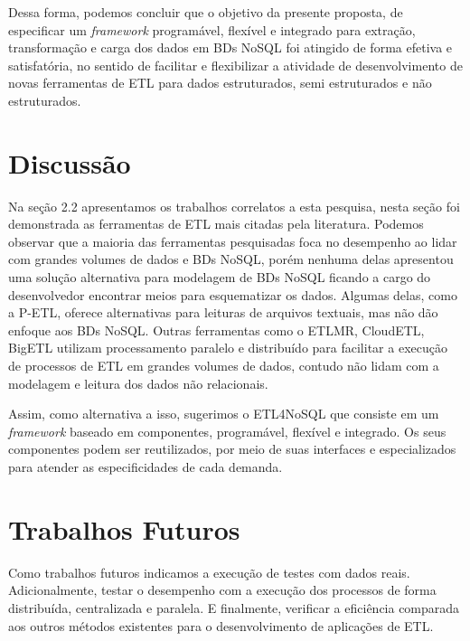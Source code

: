 Dessa forma, podemos concluir que o objetivo da presente proposta, de especificar um \textit{framework} programável, flexível e integrado para extração, transformação e carga dos dados em BDs NoSQL foi atingido de forma efetiva e satisfatória, no sentido de facilitar e flexibilizar a atividade de desenvolvimento de novas ferramentas de ETL para dados estruturados, semi estruturados e não estruturados.

\section{Discussão}

Na seção 2.2 apresentamos os trabalhos correlatos a esta pesquisa, nesta seção foi demonstrada as ferramentas de ETL mais citadas pela literatura. Podemos observar que a maioria das ferramentas pesquisadas foca no desempenho ao lidar com grandes volumes de dados e BDs NoSQL, porém nenhuma delas apresentou uma solução alternativa para modelagem de BDs NoSQL ficando a cargo do desenvolvedor encontrar meios para esquematizar os dados. Algumas delas, como a P-ETL, oferece alternativas para leituras de arquivos textuais, mas não dão enfoque aos BDs NoSQL.  Outras ferramentas como o ETLMR, CloudETL, BigETL utilizam processamento paralelo e distribuído para facilitar a execução de processos de ETL em grandes volumes de dados, contudo não lidam com a modelagem e leitura dos dados não relacionais.

Assim, como alternativa a isso, sugerimos o ETL4NoSQL que consiste em um \textit{framework} baseado em componentes, programável, flexível e integrado. Os seus componentes podem ser reutilizados, por meio de suas interfaces e especializados para atender as especificidades de cada demanda.


\section{Trabalhos Futuros}

Como trabalhos futuros indicamos a execução de testes com dados reais. Adicionalmente, testar o desempenho com a execução dos processos de forma distribuída, centralizada e paralela. E finalmente, verificar a eficiência comparada aos outros métodos existentes para o desenvolvimento de aplicações de ETL.


